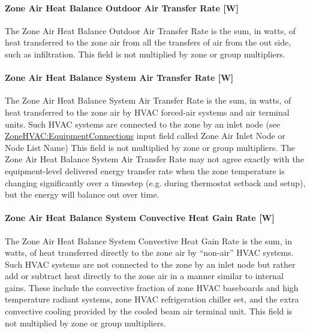 \paragraph{Zone Air Heat Balance Outdoor Air Transfer Rate {[}W{]}}\label{zone-air-heat-balance-outdoor-air-transfer-rate-w}

The Zone Air Heat Balance Outdoor Air Transfer Rate is the sum, in watts, of heat transferred to the zone air from all the transfers of air from the out side, such as infiltration. This field is not multiplied by zone or group multipliers.

\paragraph{Zone Air Heat Balance System Air Transfer Rate {[}W{]}}\label{zone-air-heat-balance-system-air-transfer-rate-w}

The Zone Air Heat Balance System Air Transfer Rate is the sum, in watts, of heat transferred to the zone air by HVAC forced-air systems and air terminal units. Such HVAC systems are connected to the zone by an inlet node (see \hyperref[zonehvacequipmentconnections]{ZoneHVAC:EquipmentConnections} input field called Zone Air Inlet Node or Node List Name) This field is not multiplied by zone or group multipliers. The Zone Air Heat Balance System Air Transfer Rate may not agree exactly with the equipment-level delivered energy transfer rate when the zone temperature is changing significantly over a timestep (e.g. during thermostat setback and setup), but the energy will balance out over time.

\paragraph{Zone Air Heat Balance System Convective Heat Gain Rate {[}W{]}}\label{zone-air-heat-balance-system-convective-heat-gain-rate-w}

The Zone Air Heat Balance System Convective Heat Gain Rate is the sum, in watts, of heat transferred directly to the zone air by ``non-air'' HVAC systems. Such HVAC systems are not connected to the zone by an inlet node but rather add or subtract heat directly to the zone air in a manner similar to internal gains. These include the convective fraction of zone HVAC baseboards and high temperature radiant systems, zone HVAC refrigeration chiller set, and the extra convective cooling provided by the cooled beam air terminal unit. This field is not multiplied by zone or group multipliers.

